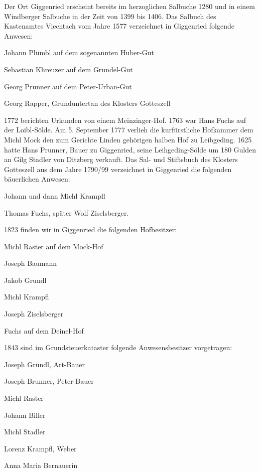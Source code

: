 Der Ort Giggenried erscheint bereits im herzoglichen Salbuche 1280 und in einem
Windberger Salbuche in der Zeit von 1399 bis 1406. Das Salbuch des Kastenamtes
Viechtach vom Jahre 1577 verzeichnet in Giggenried folgende Anwesen:



Johann Plümbl auf dem sogenannten Huber-Gut

Sebastian Khreuzer auf dem Grundel-Gut

Georg Prunner auf dem Peter-Urban-Gut

Georg Rapper, Grunduntertan des Klosters Gotteszell



1772 berichten Urkunden von einem Meinzinger-Hof. 1763 war Hans Fuchs auf der
Loibl-Sölde. Am 5. September 1777 verlieh die kurfürstliche Hofkammer dem Michl
Mock den zum Gerichte Linden gehörigen halben Hof zu Leibgeding. 1625 hatte Hans
Prunner, Bauer zu Giggenried, seine Leihgeding-Sölde um 180 Gulden an Gilg
Stadler von Ditzberg verkauft. Das Sal- und Stiftsbuch des Klosters Gotteszell
aus dem Jahre 1790/99 verzeichnet in Giggenried die folgenden bäuerlichen
Anwesen:



Johann und dann Michl Krampfl

Thomas Fuchs, später Wolf Ziselsberger.



1823 finden wir in Giggenried die folgenden Hofbesitzer:



Michl Raster auf dem Mock-Hof

Joseph Baumann

Jakob Grundl

Michl Krampfl

Joseph Ziselsberger

Fuchs auf dem Deinel-Hof



1843 sind im Grundsteuerkataster folgende Anwesensbesitzer vorgetragen:



Joseph Gründl, Art-Bauer

Joseph Brunner, Peter-Bauer

Michl Raster

Johann Biller

Michl Stadler

Lorenz Krampfl, Weber

Anna Maria Bernauerin



